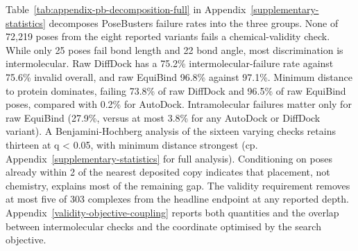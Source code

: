 
Table~\ref{tab:appendix-pb-decomposition-full} in Appendix~\ref{supplementary-statistics} decomposes PoseBusters failure rates into the three groups. None of 72,219 poses from the eight reported variants fails a chemical-validity check. While only 25 poses fail bond length and 22 bond angle, most discrimination is intermolecular. Raw DiffDock has a 75.2\% intermolecular-failure rate against 75.6\% invalid overall, and raw EquiBind 96.8\% against 97.1\%. Minimum distance to protein dominates, failing 73.8\% of raw DiffDock and 96.5\% of raw EquiBind poses, compared with 0.2\% for AutoDock. Intramolecular failures matter only for raw EquiBind (27.9\%, versus at most 3.8\% for any AutoDock or DiffDock variant). A Benjamini-Hochberg analysis of the sixteen varying checks retains thirteen at q \textless{} 0.05, with minimum distance strongest (cp. Appendix~\ref{supplementary-statistics} for full analysis). Conditioning on poses already within 2\angstrom{} of the nearest deposited copy indicates that placement, not chemistry, explains most of the remaining gap. The validity requirement removes at most five of 303 complexes from the headline endpoint at any reported depth. Appendix~\ref{validity-objective-coupling} reports both quantities and the overlap between intermolecular checks and the coordinate optimised by the search objective.

